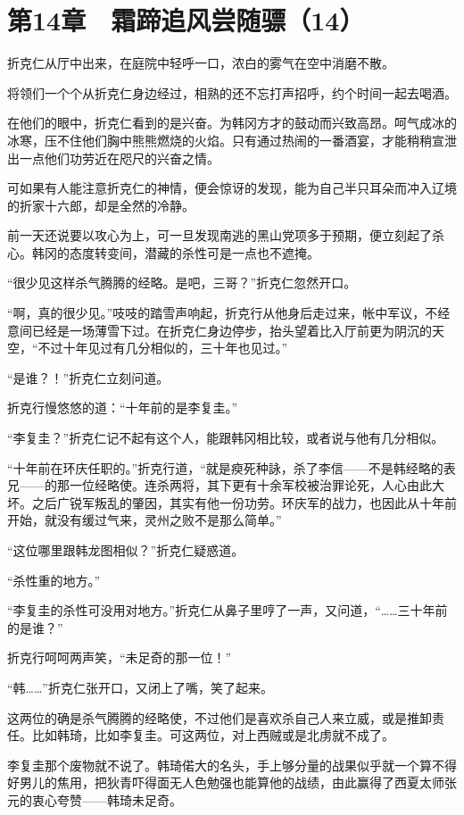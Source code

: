 \section{第14章　霜蹄追风尝随骠（14）}

折克仁从厅中出来，在庭院中轻呼一口，浓白的雾气在空中消磨不散。

将领们一个个从折克仁身边经过，相熟的还不忘打声招呼，约个时间一起去喝酒。

在他们的眼中，折克仁看到的是兴奋。为韩冈方才的鼓动而兴致高昂。呵气成冰的冰寒，压不住他们胸中熊熊燃烧的火焰。只有通过热闹的一番酒宴，才能稍稍宣泄出一点他们功劳近在咫尺的兴奋之情。

可如果有人能注意折克仁的神情，便会惊讶的发现，能为自己半只耳朵而冲入辽境的折家十六郎，却是全然的冷静。

前一天还说要以攻心为上，可一旦发现南逃的黑山党项多于预期，便立刻起了杀心。韩冈的态度转变间，潜藏的杀性可是一点也不遮掩。

“很少见这样杀气腾腾的经略。是吧，三哥？”折克仁忽然开口。

“啊，真的很少见。”吱吱的踏雪声响起，折克行从他身后走过来，帐中军议，不经意间已经是一场薄雪下过。在折克仁身边停步，抬头望着比入厅前更为阴沉的天空，“不过十年见过有几分相似的，三十年也见过。”

“是谁？！”折克仁立刻问道。

折克行慢悠悠的道：“十年前的是李复圭。”

“李复圭？”折克仁记不起有这个人，能跟韩冈相比较，或者说与他有几分相似。

“十年前在环庆任职的。”折克行道，“就是瘐死种詠，杀了李信——不是韩经略的表兄——的那一位经略使。连杀两将，其下更有十余军校被治罪论死，人心由此大坏。之后广锐军叛乱的肇因，其实有他一份功劳。环庆军的战力，也因此从十年前开始，就没有缓过气来，灵州之败不是那么简单。”

“这位哪里跟韩龙图相似？”折克仁疑惑道。

“杀性重的地方。”

“李复圭的杀性可没用对地方。”折克仁从鼻子里哼了一声，又问道，“……三十年前的是谁？”

折克行呵呵两声笑，“未足奇的那一位！”

“韩……”折克仁张开口，又闭上了嘴，笑了起来。

这两位的确是杀气腾腾的经略使，不过他们是喜欢杀自己人来立威，或是推卸责任。比如韩琦，比如李复圭。可这两位，对上西贼或是北虏就不成了。

李复圭那个废物就不说了。韩琦偌大的名头，手上够分量的战果似乎就一个算不得好男儿的焦用，把狄青吓得面无人色勉强也能算他的战绩，由此赢得了西夏太师张元的衷心夸赞——韩琦未足奇。

